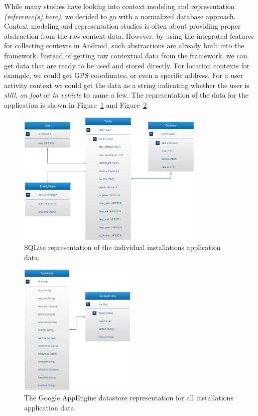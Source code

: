 While many studies have looking into context modeling and representation \emph{\color{red}(reference(s) here)}, we decided to go with a normalized database approach. Context modeling and representation studies is often about providing proper abstraction from the raw context data. However, by using the integrated features for collecting contexts in Android, such abstractions are already built into the framework. Instead of getting raw contextual data from the framework, we can get data that are ready to be used and stored directly. For location contexts for example, we could get GPS coordinates, or even a specific address. For a user activity context we could get the data as a string indicating whether the user is \emph{still}, \emph{on foot} or \emph{in vehicle} to name a few. The representation of the data for the application is shown in Figure~\ref{fig:databasemodel} and Figure~\ref{fig:databasemodelexternal}
\begin{figure}[tbp]
  \centering
  \includegraphics[width=0.8\textwidth]{figures/DatabaseModel.png}
  \caption[Database model]{SQLite representation of the individual installations application data.}
  \label{fig:databasemodel}
\end{figure}
\begin{figure}[tbp]
  \centering
  \includegraphics[width=0.5\textwidth]{figures/DatabaseModel_external.png}
  \caption[External database model]{The Google AppEngine datastore representation for all installations application data.}
  \label{fig:databasemodelexternal}
\end{figure}

